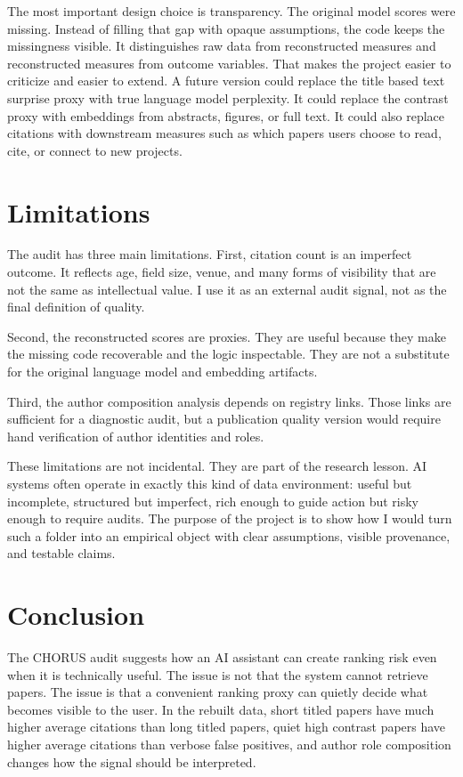 \documentclass[11pt]{article}
\begin{document}
The most important design choice is transparency. The original model scores
were missing. Instead of filling that gap with opaque assumptions, the code
keeps the missingness visible. It distinguishes raw data from reconstructed
measures and reconstructed measures from outcome variables. That makes the
project easier to criticize and easier to extend. A future version could
replace the title based text surprise proxy with true language model perplexity.
It could replace the contrast proxy with embeddings from abstracts, figures,
or full text. It could also replace citations with downstream measures such as
which papers users choose to read, cite, or connect to new projects.

\section{Limitations}

The audit has three main limitations. First, citation count is an imperfect
outcome. It reflects age, field size, venue, and many forms of visibility that
are not the same as intellectual value. I use it as an external audit signal,
not as the final definition of quality.

Second, the reconstructed scores are proxies. They are useful because they make
the missing code recoverable and the logic inspectable. They are not a
substitute for the original language model and embedding artifacts.

Third, the author composition analysis depends on registry links. Those links
are sufficient for a diagnostic audit, but a publication quality version would
require hand verification of author identities and roles.

These limitations are not incidental. They are part of the research lesson. AI
systems often operate in exactly this kind of data environment: useful but
incomplete, structured but imperfect, rich enough to guide action but risky
enough to require audits. The purpose of the project is to show how I would
turn such a folder into an empirical object with clear assumptions, visible
provenance, and testable claims.

\section{Conclusion}

The CHORUS audit suggests how an AI assistant can create ranking risk even when
it is technically useful. The issue is not that the system cannot retrieve papers. The issue is that a convenient ranking proxy can quietly decide what becomes visible to the user. In the rebuilt data, short titled papers have much higher
average citations than long titled papers, quiet high contrast papers have
higher average citations than verbose false positives, and author role
composition changes how the signal should be interpreted.
\end{document}
